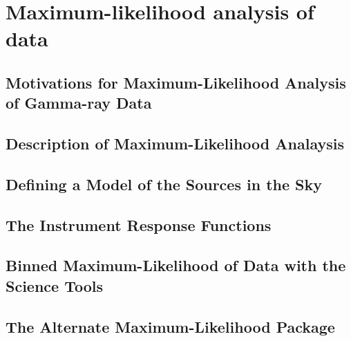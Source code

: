 \chapter{Maximum-likelihood analysis of  data}



\section{Motivations for Maximum-Likelihood Analysis of Gamma-ray Data}


\section{Description of Maximum-Likelihood Analaysis}


\section{Defining a Model of the Sources in the Sky}


\section{The  Instrument Response Functions}


\section{Binned Maximum-Likelihood of  Data with the Science Tools}



\section{The Alternate Maximum-Likelihood Package \pointlike}

